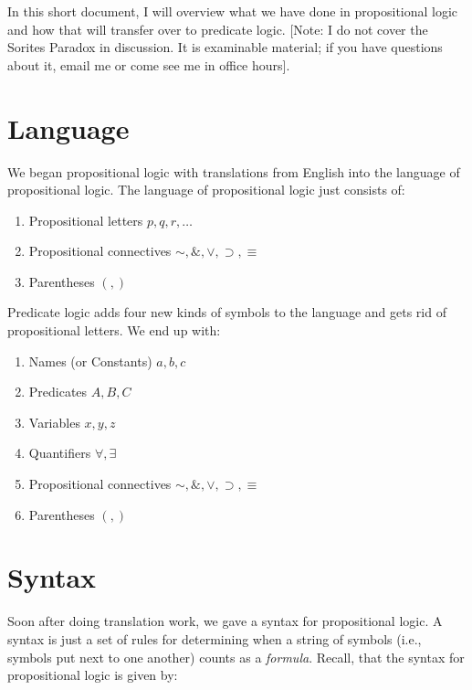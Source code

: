 \documentclass[
]{book}
\providecommand{\tightlist}{%
  \setlength{\itemsep}{0pt}\setlength{\parskip}{0pt}}
\begin{document}
In this short document, I will overview what we have done in propositional logic and how that will transfer over to predicate logic. {[}Note: I do not cover the Sorites Paradox in discussion. It is examinable material; if you have questions about it, email me or come see me in office hours{]}.

\hypertarget{language}{%
\section{Language}\label{language}}

We began propositional logic with translations from English into the language of propositional logic. The language of propositional logic just consists of:

\begin{enumerate}
\def\labelenumi{\arabic{enumi}.}
\tightlist
\item
  Propositional letters \(p,q,r,\ldots\)
\item
  Propositional connectives \(\sim, \&, \lor, \supset, \equiv\)
\item
  Parentheses \((,)\)
\end{enumerate}

Predicate logic adds four new kinds of symbols to the language and gets rid of propositional letters. We end up with:

\begin{enumerate}
\def\labelenumi{\arabic{enumi}.}
\tightlist
\item
  Names (or Constants) \(a,b,c\)
\item
  Predicates \(A,B,C\)
\item
  Variables \(x,y,z\)
\item
  Quantifiers \(\forall, \exists\)
\item
  Propositional connectives \(\sim, \&, \lor, \supset, \equiv\)
\item
  Parentheses \((,)\)
\end{enumerate}

\hypertarget{syntax}{%
\section{Syntax}\label{syntax}}

Soon after doing translation work, we gave a syntax for propositional logic. A syntax is just a set of rules for determining when a string of symbols (i.e., symbols put next to one another) counts as a \emph{formula}. Recall, that the syntax for propositional logic is given by:
\end{document}
